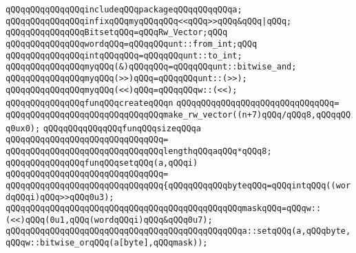 \newline
\verb|qQQqqQQqqQQqqQQqincludeqQQqpackageqQQqqQQqqQQqa;|\newline
\newline
\verb|qQQqqQQqqQQqqQQqinfixqQQqmyqQQqqQQq<<qQQq>>qQQq&qQQq|\verb#|qQQq;#\newline
\newline
\verb|qQQqqQQqqQQqqQQqBitsetqQQq=qQQqRw_Vector;qQQq|\newline
\newline
\verb|qQQqqQQqqQQqqQQqwordqQQq=qQQqqQQqunt::from_int;qQQq|\newline
\verb|qQQqqQQqqQQqqQQqintqQQqqQQq=qQQqqQQqunt::to_int;|\newline
\newline
\verb|qQQqqQQqqQQqqQQqmyqQQq(&)qQQqqQQq=qQQqqQQqunt::bitwise_and;|\newline
\verb|qQQqqQQqqQQqqQQqmyqQQq(>>)qQQq=qQQqqQQqunt::(>>);|\newline
\verb|qQQqqQQqqQQqqQQqmyqQQq(<<)qQQq=qQQqqQQqw::(<<);|\newline
\newline
\verb|qQQqqQQqqQQqqQQqfunqQQqcreateqQQqn|\newline
\verb|qQQqqQQqqQQqqQQqqQQqqQQqqQQqqQQq=|\newline
\verb|qQQqqQQqqQQqqQQqqQQqqQQqqQQqqQQqmake_rw_vector((n+7)qQQq/qQQq8,qQQqqQQq0ux0);|\newline
\newline
\newline
\verb|qQQqqQQqqQQqqQQqfunqQQqsizeqQQqa|\newline
\verb|qQQqqQQqqQQqqQQqqQQqqQQqqQQqqQQq=|\newline
\verb|qQQqqQQqqQQqqQQqqQQqqQQqqQQqqQQqlengthqQQqaqQQq*qQQq8;|\newline
\newline
\newline
\verb|qQQqqQQqqQQqqQQqfunqQQqsetqQQq(a,qQQqi)|\newline
\verb|qQQqqQQqqQQqqQQqqQQqqQQqqQQqqQQq=|\newline
\verb|qQQqqQQqqQQqqQQqqQQqqQQqqQQqqQQq{qQQqqQQqqQQqbyteqQQq=qQQqintqQQq((wordqQQqi)qQQq>>qQQq0u3);|\newline
\verb|qQQqqQQqqQQqqQQqqQQqqQQqqQQqqQQqqQQqqQQqqQQqqQQqmaskqQQq=qQQqw::(<<)qQQq(0u1,qQQq(wordqQQqi)qQQq&qQQq0u7);|\newline
\verb|qQQqqQQqqQQqqQQqqQQqqQQqqQQqqQQqqQQqqQQqqQQqqQQqa::setqQQq(a,qQQqbyte,qQQqw::bitwise_orqQQq(a[byte],qQQqmask));|\newline
